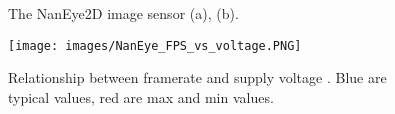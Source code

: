 


\begin{figure}[H]
\begin{minipage}[]{.5\linewidth}
\centering
{}
\end{minipage}%
\begin{minipage}[]{.5\linewidth}
\centering
\end{minipage}

\caption{The NanEye2D image sensor (a), (b).}
\label{fig:NanEye2D}
\end{figure}




\begin{figure}[H]
\centering
   \texttt{[image: images/NanEye\_FPS\_vs\_voltage.PNG]}
  \caption{ Relationship between framerate and supply voltage \cite{Eyes_of_things_NanEye}. Blue are typical values, red are max and min values. } 
  \label{fig:FPS_vs_voltage}
\end{figure}


 
 